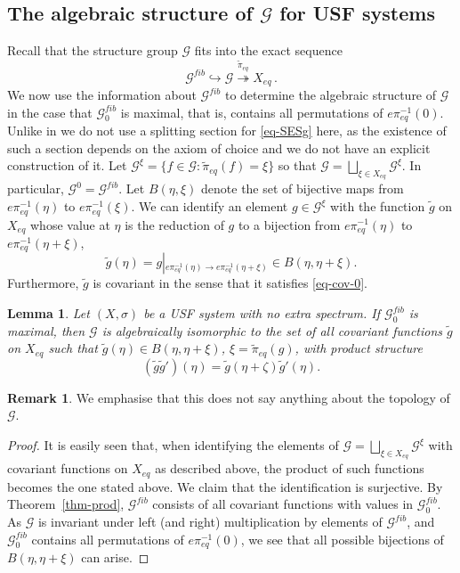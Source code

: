 \documentclass[12pt]{amsart}
\newtheorem{lemma}[theorem]{Lemma}
\theoremstyle{definition}
\newtheorem{remark}[theorem]{Remark}
\numberwithin{equation}{section}
\newcommand{\Gg}{{\mathcal G}}
\newcommand{\Xe}{X_{eq}}
\newcommand{\pe}{\pi_{eq}}
\begin{document}
\subsection{The algebraic structure of $\Gg$ for USF systems}  
Recall that the structure group $\Gg$ fits into the exact sequence
\begin{equation}\label{eq-SESg}
\Gg^{fib} \hookrightarrow  \Gg \stackrel{\widetilde\pe} \twoheadrightarrow \Xe \, .
\end{equation}
We now use the information about $\Gg^{fib}$ to determine the algebraic structure of $\Gg$ in the case that $\Gg_0^{fib}$ is maximal, that is, contains all permutations of $e\pe^{-1}(0)$. Unlike in \cite{ESBS} we do not use a splitting section for \eqref{eq-SESg} here, as the existence of such a section depends on  the axiom of choice and we do not have an explicit construction of it. 
Let $\Gg^\xi = \{f\in \Gg: \widetilde\pe (f) = \xi\}$ so that $\Gg = \bigsqcup_{\xi\in \Xe} \Gg^\xi$. In particular, $\Gg^0=\Gg^{fib}$.
Let $B(\eta,\xi)$ denote the set of bijective maps from $e\pe^{-1}(\eta)$ to $e\pe^{-1}(\xi)$. We can identify an element $g\in \Gg^\xi$ with the function $\tilde g$ on $\Xe$ whose value at $\eta$ is the reduction of  $g$ to  
a bijection from $e\pe^{-1}(\eta)$ to $e\pe^{-1}(\eta+\xi)$,
$$\tilde g(\eta) = g\left|_{ e\pe^{-1}(\eta)\to e\pe^{-1}(\eta+\xi)}\right.  \in B(\eta,\eta+\xi).$$
Furthermore, $\tilde g$ is covariant in the sense that it satisfies \eqref{eq-cov-0}. 
\begin{lemma}\label{lem-alg-iso}
Let $(X,\sigma)$ be a USF system with no extra spectrum. If  $\Gg_0^{fib}$ is maximal, then
 $\Gg$ is algebraically isomorphic to the set of all covariant functions $\tilde g$ on $\Xe$ such that $\tilde g(\eta) \in B(\eta,\eta+\xi)$, $\xi= \widetilde\pe (g)$,
with product structure 
$$(\tilde g\tilde g')(\eta) = \tilde g(\eta+\zeta) \tilde g'(\eta).$$
\end{lemma}
\begin{remark}We emphasise that this does not say anything about the topology of $\Gg$. \end{remark}
\begin{proof} 
It is easily seen that,
when identifying the elements of $\Gg = \bigsqcup_{\xi\in \Xe} \Gg^\xi$ 
with covariant functions on $\Xe$ as described above, the product of such functions becomes the one stated above. We claim that the identification is surjective. 
 By Theorem~\ref{thm-prod},  $\Gg^{fib}$ consists of all covariant functions with values in $\Gg_0^{fib}$. 
As $\Gg$ is invariant under left (and right) multiplication by elements of $\Gg^{fib}$, and $\Gg_0^{fib}$ contains all  permutations of $e\pe^{-1}(0)$, we see that all possible bijections of $B(\eta,\eta+\xi)$ can arise. 
\end{proof}
\end{document}
